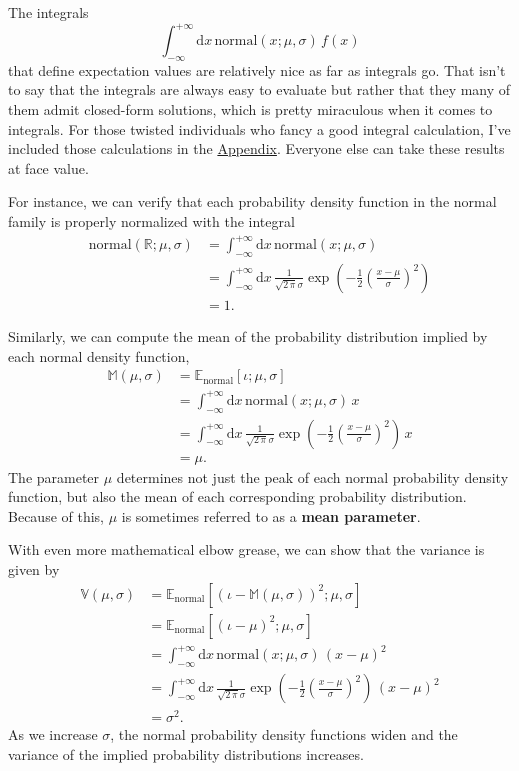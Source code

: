 \documentclass[
  letterpaper,
  DIV=11,
  numbers=noendperiod]{scrartcl}
\begin{document}
The integrals \[
\int_{-\infty}^{+\infty} \mathrm{d} x \,
\mathrm{normal}(x; \mu, \sigma) \, f(x)
\] that define expectation values are relatively nice as far as
integrals go. That isn't to say that the integrals are always easy to
evaluate but rather that they many of them admit closed-form solutions,
which is pretty miraculous when it comes to integrals. For those twisted
individuals who fancy a good integral calculation, I've included those
calculations in the \hyperref[sec:appendix]{Appendix}. Everyone else can
take these results at face value.

For instance, we can verify that each probability density function in
the normal family is properly normalized with the integral
\begin{align*}
\mathrm{normal}(\mathbb{R}; \mu, \sigma)
&=
\int_{-\infty}^{+\infty} \mathrm{d} x \,
\mathrm{normal}(x; \mu, \sigma)
\\
&=
\int_{-\infty}^{+\infty} \mathrm{d} x \,
\frac{1}{\sqrt{2 \, \pi} \sigma}
\exp \left( -\frac{1}{2} \left( \frac{x - \mu}{\sigma} \right)^{2} \right)
\\
&=
1.
\end{align*}

Similarly, we can compute the mean of the probability distribution
implied by each normal density function, \begin{align*}
\mathbb{M}(\mu, \sigma)
&=
\mathbb{E}_{\mathrm{normal}}[ \iota; \mu, \sigma ]
\\
&=
\int_{-\infty}^{+\infty} \mathrm{d} x \,
\mathrm{normal}(x; \mu, \sigma) \, x
\\
&=
\int_{-\infty}^{+\infty} \mathrm{d} x \,
\frac{1}{\sqrt{2 \, \pi} \sigma}
\exp \left(
  -\frac{1}{2} \left( \frac{x - \mu}{\sigma} \right)^{2}
\right)
\, x
\\
&=
\mu.
\end{align*} The parameter \(\mu\) determines not just the peak of each
normal probability density function, but also the mean of each
corresponding probability distribution. Because of this, \(\mu\) is
sometimes referred to as a \textbf{mean parameter}.

With even more mathematical elbow grease, we can show that the variance
is given by \begin{align*}
\mathbb{V}(\mu, \sigma)
&=
\mathbb{E}_{\mathrm{normal}}[
  (\iota - \mathbb{M}(\mu, \sigma))^{2}; \mu, \sigma
]
\\
&=
\mathbb{E}_{\mathrm{normal}}[ (\iota - \mu)^{2}; \mu, \sigma ]
\\
&=
\int_{-\infty}^{+\infty} \mathrm{d} x \,
\mathrm{normal}(x; \mu, \sigma) \, (x - \mu)^{2}
\\
&=
\int_{-\infty}^{+\infty} \mathrm{d} x \,
\frac{1}{\sqrt{2 \, \pi} \sigma}
\exp \left(
  -\frac{1}{2} \left( \frac{x - \mu}{\sigma} \right)^{2}
\right)
\, (x - \mu)^{2}
\\
&=
\sigma^{2}.
\end{align*} As we increase \(\sigma\), the normal probability density
functions widen and the variance of the implied probability
distributions increases.
\end{document}
